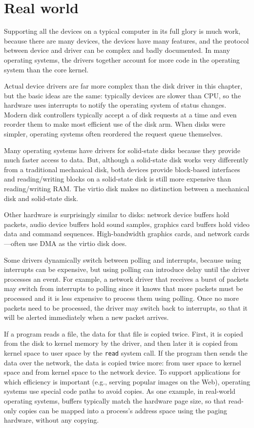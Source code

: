 \section{Real world}

Supporting all the devices on a typical computer in its full glory is
much work, because there are many devices, the devices have many
features, and the protocol between device and driver can be complex
and badly documented.
In many operating systems, the drivers together account for more code
in the operating system than the core kernel.

Actual device drivers are far more complex than the disk driver in this chapter,
but the basic ideas are the same:
typically devices are slower than CPU, so the hardware uses
interrupts to notify the operating system of status changes.
Modern disk controllers typically
accept a 
of disk requests at a time and even reorder
them to make most efficient use of the disk arm.
When disks were simpler, operating systems often reordered the
request queue themselves.

Many operating systems have drivers for solid-state disks because they
provide much faster access to data.  But, although a solid-state disk
works very differently from a traditional mechanical disk, both
devices provide block-based interfaces and reading/writing blocks on a
solid-state disk is still more expensive than reading/writing RAM.
The virtio disk makes no distinction between a mechanical disk and
solid-state disk.

Other hardware is surprisingly similar to disks: network device
buffers hold packets, audio device buffers hold sound samples,
graphics card buffers hold video data and command sequences.
High-bandwidth graphics cards, and network cards—often use DMA
as the virtio disk does.

Some drivers dynamically switch between polling and interrupts, because using
interrupts can be expensive, but using polling can introduce delay until the
driver processes an event.  For example, a network driver that receives a
burst of packets may switch from interrupts to polling since it knows that more
packets must be processed and it is less expensive to process them using polling.
Once no more packets need to be processed, the driver may switch back to
interrupts, so that it will be alerted immediately when a new packet arrives.

If a program reads a file, the data for that file is copied twice.  First, it
is copied from the disk to kernel memory by the driver, and then later it is
copied from kernel space to user space by the 
\lstinline{read}
system call.  If the program then sends the data over the network, 
the data is copied twice more: from user space to kernel space and from
kernel space to the network device.  To support applications for which 
efficiency is important (e.g., serving popular images on the Web), operating systems
use special code paths to avoid copies.  As one example,
in real-world operating systems, 
buffers typically match the hardware page size, so that
read-only copies can be mapped into a process's address space
using the paging hardware, without any copying.


